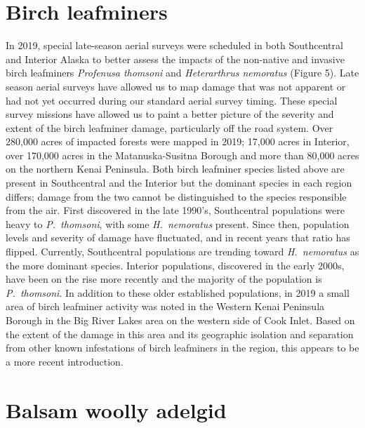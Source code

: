 \section{Birch leafminers}

In 2019, special late-season aerial surveys were scheduled in both Southcentral and Interior Alaska to better assess the impacts of the non-native and invasive birch leafminers \textit{Profenusa thomsoni} and \textit{Heterarthrus nemoratus} (Figure 5). Late season aerial surveys have allowed us to map damage that was not apparent or had not yet occurred during our standard aerial survey timing. These special survey missions have allowed us to paint a better picture of the severity and extent of the birch leafminer damage, particularly off the road system. Over 280,000 acres of impacted forests were mapped in 2019; 17,000 acres in Interior, over 170,000 acres in the Matanuska-Susitna Borough and more than 80,000 acres on the northern Kenai Peninsula. Both birch leafminer species listed above are present in Southcentral and the Interior but the dominant species in each region differs; damage from the two cannot be distinguished to the species responsible from the air. First discovered in the late 1990’s, Southcentral populations were heavy to \textit{P.\ thomsoni}, with some \textit{H.\ nemoratus} present. Since then, population levels and severity of damage have fluctuated, and in recent years that ratio has flipped. Currently, Southcentral populations are trending toward \textit{H.\ nemoratus} as the more dominant species. Interior populations, discovered in the early 2000s, have been on the rise more recently and the majority of the population is \textit{P.\ thomsoni}. In addition to these older established populations, in 2019 a small area of birch leafminer activity was noted in the Western Kenai Peninsula Borough in the Big River Lakes area on the western side of Cook Inlet. Based on the extent of the damage in this area and its geographic isolation and separation from other known infestations of birch leafminers in the region, this appears to be a more recent introduction.

\section{Balsam woolly adelgid}

